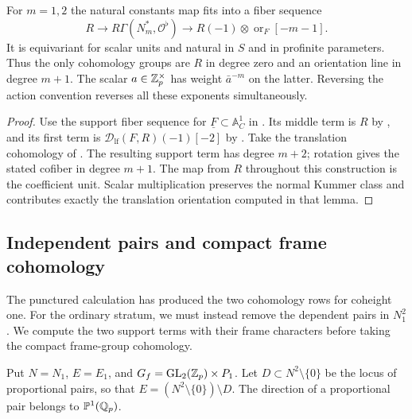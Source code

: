 \begin{proposition}\label{h3:prop:punctured-cohomology}
For $m=1,2$ the natural constants map fits into a fiber sequence
\[
 R\longrightarrow R\Gamma(N_m^*,\mathcal O^\flat)
   \longrightarrow
 R(-1)\otimes\operatorname{or}_F[-m-1].
\]
It is equivariant for scalar units and natural in $S$ and in
profinite parameters.  Thus the only cohomology groups are
$R$ in degree zero and an orientation line in degree $m+1$.
The scalar $a\in\mathbb Z_p^\times$ has weight $\bar a^{-m}$ on
the latter.  Reversing the action convention reverses all
these exponents simultaneously.
\end{proposition}
\begin{proof}
Use the support fiber sequence for
$\underline F\subset\mathbb A^1_C$ in
.  Its middle term is $R$ by
, and its first term is
$\mathcal D_{\mathrm{lf}}(F,R)(-1)[-2]$ by
.  Take the translation cohomology
of .  The resulting support term
has degree $m+2$; rotation gives the stated cofiber in
degree $m+1$.  The map from $R$ throughout this construction
is the coefficient unit.  Scalar multiplication preserves
the normal Kummer class and contributes exactly the
translation orientation computed in that lemma.
\end{proof}

\subsection{Independent pairs and compact frame cohomology}

The punctured calculation has produced the two cohomology rows for
coheight one.  For the ordinary stratum, we must instead remove the
dependent pairs in $N_1^2$.  We compute the two support terms with
their frame characters before taking the compact frame-group
cohomology.

Put $N=N_1$, $E=E_1$, and $G_f=\operatorname{GL}_2(\mathbb Z_p)\times P_1$.
Let $D\subset N^2\setminus\{0\}$ be the locus of proportional
pairs, so that $E=(N^2\setminus\{0\})\setminus D$.
The direction of a proportional pair belongs to
$\mathbb P^1(\mathbb Q_p)$.


